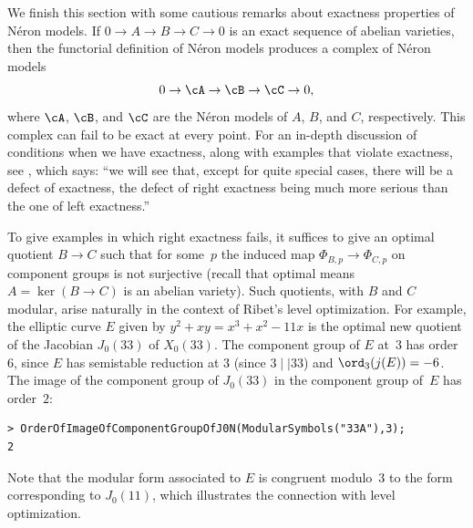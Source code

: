 \documentclass{report}
\begin{document}

We finish this section with some cautious remarks about exactness
properties of N\'eron models. If $0\to A\to B\to C\to 0$ is an
exact sequence of abelian varieties, then the functorial
definition of N\'eron models produces a complex of N\'eron models
\[
  0 \to \cA \to \cB \to \cC \to 0,
\]
where $\cA$, $\cB$, and $\cC$ are the N\'eron models of $A$, $B$,
and $C$, respectively.  This complex can fail to be exact at every
point.  For an in-depth discussion of conditions when we have
exactness, along with examples that violate exactness, see
\cite[Ch.~7]{neronmodels}, which says: ``we will see that, except
for quite special cases, there will be a defect of exactness, the
defect of right exactness being much more serious than the one of
left exactness.''

To give examples in which right exactness fails, it suffices to
give an optimal quotient $B\to C$ such that for some~$p$ the
induced map $\Phi_{B,p}\to \Phi_{C,p}$ on component groups is not
surjective (recall that optimal means $A=\ker(B\to C)$ is an
abelian variety). Such quotients, with $B$ and $C$ modular, arise
naturally in the context of Ribet's level optimization.  For
example, the elliptic curve $E$ given by $y^2 + xy = x^3 + x^2 -
11x$ is the optimal new quotient of the Jacobian $J_0(33)$ of
$X_0(33)$. The component group of $E$ at~$3$ has order~$6$, since
$E$ has semistable reduction at $3$ (since $3\mid\mid 33$) and
$\ord_3(j(E)) = -6$. The image of the component group of $J_0(33)$
in the component group of~$E$ has order~$2$:
\begin{verbatim}
> OrderOfImageOfComponentGroupOfJ0N(ModularSymbols("33A"),3);
2
\end{verbatim}
Note that the modular form associated to $E$ is congruent
modulo~$3$ to the form corresponding to $J_0(11)$, which
illustrates the connection with level optimization.
\end{document}
